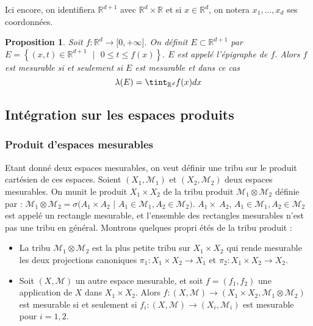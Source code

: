 \documentclass[3pt]{article}
\newtheorem{proposition}[theorem]{Proposition}
\begin{document}
\bigskip 

Ici encore, on identifiera $\mathbb{R}^{d+1}$ avec $\mathbb{R}^{d}\times 
\mathbb{R}$ et si $x\in \mathbb{R}^{d}$, on notera $x_{1},...,x_{d}$ ses
coordonn\'{e}es.

\bigskip 

\begin{proposition}
Soit $f:\mathbb{R}^{d}\rightarrow \lbrack 0,+\infty ]$. On d\'{e}finit $%
E\subset \mathbb{R}^{d+1}$ par $E=\left\{ (x,t)\in \mathbb{R}^{d+1}\text{ }|%
\text{ }0\leq t\leq f(x)\right\} .$ $E$ est appel\'{e} l'\'{e}pigraphe de $f.
$ Alors $f$ est mesurable si et seulement si $E$ est mesurable et dans ce
cas 
\begin{equation*}
\lambda (E)=\tint_{\mathbb{R}^{d}}f(x)dx
\end{equation*}
\end{proposition}

\bigskip 

\subsection{Int\'{e}gration sur les espaces produits}

\bigskip

\subsubsection{Produit d'espaces mesurables}

Etant donn\'{e} deux espaces mesurables, on veut d\'{e}finir une tribu sur
le produit cart\'{e}sien de ces espaces. Soient $(X_{1},\mathcal{M}_{1})$ et 
$(X_{2},\mathcal{M}_{2})$ deux espaces mesurables. On munit le produit $%
X_{1}\times X_{2}$ de la tribu produit $\mathcal{M}_{1}\otimes \mathcal{M}%
_{2}$ d\'{e}finie par : $\mathcal{M}_{1}\otimes \mathcal{M}_{2}=\sigma
(A_{1}\times A_{2}$ $|$ $A_{1}\in \mathcal{M}_{1},A_{2}\in \mathcal{M}_{2}).$
$A_{1}\times \ A_{2}$, $A_{1}\in \mathcal{M}_{1},A_{2}\in \mathcal{M}_{2}$
est appel\'{e} un rectangle mesurable, et l'ensemble des rectangles
mesurables n'est pas une tribu en g\'{e}n\'{e}ral. Montrons quelques propri%
\'{e}t\'{e}s de la tribu produit :

\begin{itemize}
\item La tribu $\mathcal{M}_{1}\otimes \mathcal{M}_{2}$ est la plus petite
tribu sur $X_{1}\times X_{2}$ qui rende mesurable les deux projections
canoniques $\pi _{1}:X_{1}\times X_{2}\rightarrow X_{1}$ et $\pi
_{2}:X_{1}\times X_{2}\rightarrow X_{2}$.

\item Soit $(X,\mathcal{M})$ un autre espace mesurable, et soit $%
f=(f_{1},f_{2})$ une application de $X$ dans $X_{1}\times X_{2}$. Alors $%
f:(X,\mathcal{M})\rightarrow (X_{1}\times X_{2},\mathcal{M}_{1}\otimes 
\mathcal{M}_{2})$ est mesurable si et seulement si $f_{i}:(X,\mathcal{M}%
)\rightarrow (X_{i},\mathcal{M}_{i})$ est mesurable pour $i=1,2$.
\end{itemize}
\end{document}
